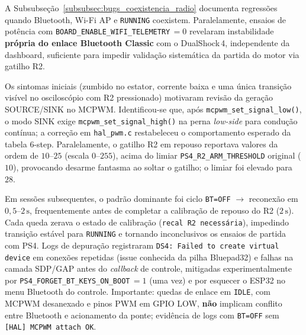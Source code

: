A Subsubseção~\ref{subsubsec:bugs_coexistencia_radio} documenta regressões quando Bluetooth, Wi-Fi AP e \texttt{RUNNING} coexistem. Paralelamente, ensaios de potência com \texttt{BOARD\_ENABLE\_WIFI\_TELEMETRY}\,$= 0$ revelaram instabilidade \textbf{própria do enlace Bluetooth Classic} com o DualShock\,4, independente da dashboard, suficiente para impedir validação sistemática da partida do motor via gatilho R2.

Os sintomas iniciais (zumbido no estator, corrente baixa e uma única transição visível no osciloscópio com R2 pressionado) motivaram revisão da geração SOURCE/SINK no MCPWM. Identificou-se que, após \texttt{mcpwm\_set\_signal\_low()}, o modo SINK exige \texttt{mcpwm\_set\_signal\_high()} na perna \textit{low-side} para condução contínua; a correção em \texttt{hal\_pwm.c} restabeleceu o comportamento esperado da tabela 6-step. Paralelamente, o gatilho R2 em repouso reportava valores da ordem de $10$--$25$ (escala $0$--$255$), acima do limiar \texttt{PS4\_R2\_ARM\_THRESHOLD} original ($10$), provocando desarme fantasma ao soltar o gatilho; o limiar foi elevado para $28$.

Em sessões subsequentes, o padrão dominante foi ciclo \texttt{BT=OFF} $\to$ reconexão em $0{,}5$--$2\,\text{s}$, frequentemente antes de completar a calibração de repouso do R2 ($2\,\text{s}$). Cada queda zerava o estado de calibração (\texttt{recal R2 necessária}), impedindo transição estável para \texttt{RUNNING} e tornando inconclusivos os ensaios de partida com PS4. Logs de depuração registraram \texttt{DS4: Failed to create virtual device} em conexões repetidas (issue conhecida da pilha Bluepad32) e falhas na camada SDP/GAP antes do \textit{callback} de controle, mitigadas experimentalmente por \texttt{PS4\_FORGET\_BT\_KEYS\_ON\_BOOT}\,$= 1$ (uma vez) e por esquecer o ESP32 no menu Bluetooth do controle. Importante: quedas de enlace em \texttt{IDLE}, com MCPWM desanexado e pinos PWM em GPIO LOW, \textbf{não} implicam conflito entre Bluetooth e acionamento da ponte; evidência de logs com \texttt{BT=OFF} sem \texttt{[HAL] MCPWM attach OK}.


